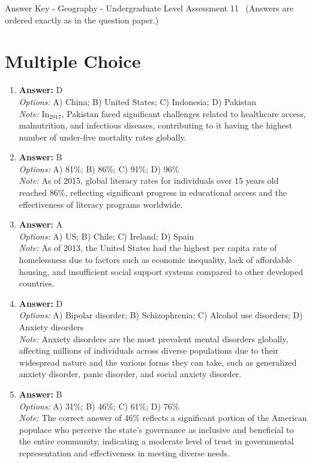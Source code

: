\documentclass[12pt]{article}
\begin{document}
\begin{center}
Answer Key - Geography - Undergraduate Level Assessment 11 \
\small (Answers are ordered exactly as in the question paper.)
\end{center}

\section*{Multiple Choice}
\begin{enumerate}[label=\arabic*.]
\item \textbf{Answer:} D
\\ \textit{Options:} A) China; B) United States; C) Indonesia; D) Pakistan
\\ \textit{Note:} In$_{2017}$, Pakistan faced significant challenges related to healthcare access, malnutrition, and infectious diseases, contributing to it having the highest number of under-five mortality rates globally.
\item \textbf{Answer:} B
\\ \textit{Options:} A) 81\%; B) 86\%; C) 91\%; D) 96\%
\\ \textit{Note:} As of 2015, global literacy rates for individuals over 15 years old reached 86\%, reflecting significant progress in educational access and the effectiveness of literacy programs worldwide.
\item \textbf{Answer:} A
\\ \textit{Options:} A) US; B) Chile; C) Ireland; D) Spain
\\ \textit{Note:} As of 2013, the United States had the highest per capita rate of homelessness due to factors such as economic inequality, lack of affordable housing, and insufficient social support systems compared to other developed countries.
\item \textbf{Answer:} D
\\ \textit{Options:} A) Bipolar disorder; B) Schizophrenia; C) Alcohol use disorders; D) Anxiety disorders
\\ \textit{Note:} Anxiety disorders are the most prevalent mental disorders globally, affecting millions of individuals across diverse populations due to their widespread nature and the various forms they can take, such as generalized anxiety disorder, panic disorder, and social anxiety disorder.
\item \textbf{Answer:} B
\\ \textit{Options:} A) 31\%; B) 46\%; C) 61\%; D) 76\%
\\ \textit{Note:} The correct answer of 46\% reflects a significant portion of the American populace who perceive the state's governance as inclusive and beneficial to the entire community, indicating a moderate level of trust in governmental representation and effectiveness in meeting diverse needs.
\end{enumerate}
\end{document}
